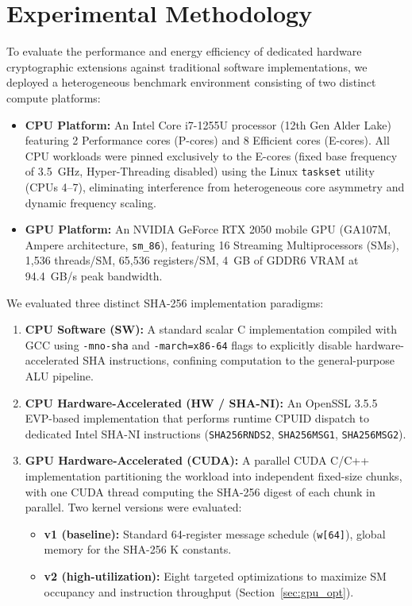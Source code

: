 
\section{Experimental Methodology}
\label{sec:methodology}

To evaluate the performance and energy efficiency of dedicated hardware cryptographic extensions against traditional software implementations, we deployed a heterogeneous benchmark environment consisting of two distinct compute platforms:
\begin{itemize}
    \item \textbf{CPU Platform:} An Intel Core i7-1255U processor (12th Gen Alder Lake) featuring 2 Performance cores (P-cores) and 8 Efficient cores (E-cores). All CPU workloads were pinned exclusively to the E-cores (fixed base frequency of 3.5~GHz, Hyper-Threading disabled) using the Linux \texttt{taskset} utility (CPUs 4--7), eliminating interference from heterogeneous core asymmetry and dynamic frequency scaling.
    \item \textbf{GPU Platform:} An NVIDIA GeForce RTX 2050 mobile GPU (GA107M, Ampere architecture, \texttt{sm\_86}), featuring 16 Streaming Multiprocessors (SMs), 1,536 threads/SM, 65,536 registers/SM, 4~GB of GDDR6 VRAM at 94.4~GB/s peak bandwidth.
\end{itemize}

We evaluated three distinct SHA-256 implementation paradigms:
\begin{enumerate}
    \item \textbf{CPU Software (SW):} A standard scalar C implementation compiled with GCC using \texttt{-mno-sha} and \texttt{-march=x86-64} flags to explicitly disable hardware-accelerated SHA instructions, confining computation to the general-purpose ALU pipeline.
    \item \textbf{CPU Hardware-Accelerated (HW / SHA-NI):} An OpenSSL 3.5.5 EVP-based implementation that performs runtime CPUID dispatch to dedicated Intel SHA-NI instructions (\texttt{SHA256RNDS2}, \texttt{SHA256MSG1}, \texttt{SHA256MSG2}).
    \item \textbf{GPU Hardware-Accelerated (CUDA):} A parallel CUDA C/C++ implementation partitioning the workload into independent fixed-size chunks, with one CUDA thread computing the SHA-256 digest of each chunk in parallel. Two kernel versions were evaluated:
    \begin{itemize}
        \item \textbf{v1 (baseline):} Standard 64-register message schedule (\texttt{w[64]}), global memory for the SHA-256 K constants.
        \item \textbf{v2 (high-utilization):} Eight targeted optimizations to maximize SM occupancy and instruction throughput (Section~\ref{sec:gpu_opt}).
    \end{itemize}
\end{enumerate}

